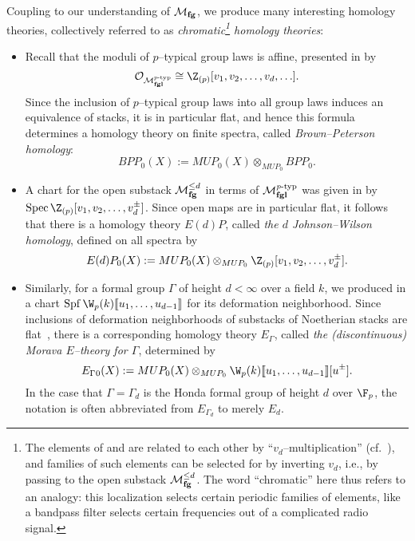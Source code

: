 \begin{definition}\label{DefnChromaticHomologyThys}
Coupling  to our understanding of \(\mathcal{M}_{\mathbf{fg}}\), we produce many interesting homology theories, collectively referred to as \textit{chromatic\footnote{The elements of  and  are related to each other by ``\(v_d\)--multiplication'' (cf.\ ), and families of such elements can be selected for by inverting \(v_d\), i.e., by passing to the open substack \(\mathcal{M}_{\mathbf{fg}}^{\le d}\).  The word ``chromatic'' here thus refers to an analogy: this localization selects certain periodic families of elements, like a bandpass filter selects certain frequencies out of a complicated radio signal.} homology theories}:
\begin{itemize}
\item Recall that the moduli of \(p\)--typical group laws is affine, presented in  by \[\sheaf O_{\moduli{fgl}^{\ptyp}} \cong \Z_{(p)}[v_1, v_2, \ldots, v_d, \ldots].\]  Since the inclusion of \(p\)--typical group laws into all group laws induces an equivalence of stacks, it is in particular flat, and hence this formula determines a homology theory on finite spectra, called \textit{Brown--Peterson homology}: \[BPP_0(X) := MUP_0(X) \otimes_{MUP_0} BPP_0.\]
\item A chart for the open substack \(\mathcal{M}_{\mathbf{fg}}^{\le d}\) in terms of \(\mathcal{M}_{\mathbf{fgl}}^{\mathit{p}\text{-}\mathrm{typ}}\) was given in  by \(\Spec \Z_{(p)}[v_1, v_2, \ldots, v_d^\pm]\).  Since open maps are in particular flat, it follows that there is a homology theory \(E(d)P\), called \textit{the \(d\){\th} Johnson--Wilson homology}, defined on all spectra by \[E(d)P_0(X) := MUP_0(X) \otimes_{MUP_0} \Z_{(p)}[v_1, v_2, \ldots, v_d^\pm].\]
\item Similarly, for a formal group \(\Gamma\) of height \(d < \infty\) over a field \(k\), we produced in  a chart \(\Spf \W_p(k)\ps{u_1, \ldots, u_{d-1}}\) for its deformation neighborhood.  Since inclusions of deformation neighborhoods of substacks of Noetherian stacks are flat~\cite{Matsumura}, there is a corresponding homology theory \(E_\Gamma{}\), called \textit{the (discontinuous) Morava \(E\)--theory for \(\Gamma\)}, determined by \[E_\Gamma{}_0(X) := MUP_0(X) \otimes_{MUP_0} \W_p(k)\ps{u_1, \ldots, u_{d-1}}[u^\pm].\]  In the case that \(\Gamma = \Gamma_d\) is the Honda formal group of height \(d\) over \(\F_p\), the notation is often abbreviated from \(E_{\Gamma_d}\) to merely \(E_d\).

\end{itemize}
\end{definition}
